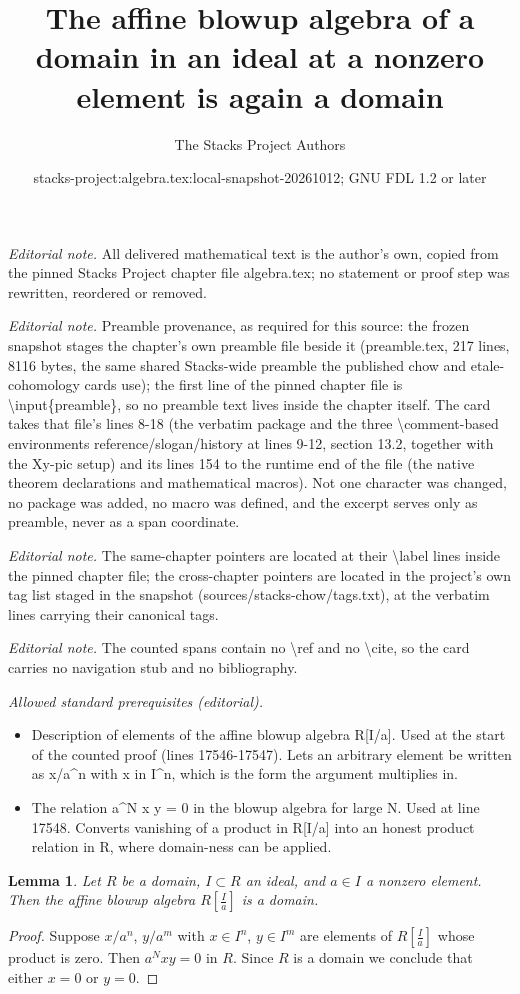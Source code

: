 \documentclass[10pt,a4paper]{amsart}
\title{The affine blowup algebra of a domain in an ideal at a nonzero element is again a domain}
\author{The Stacks Project Authors}
\date{stacks-project:algebra.tex:local-snapshot-20261012; GNU FDL 1.2 or later}
\theoremstyle{plain}
\newtheorem{lemma}[subsection]{Lemma}
\theoremstyle{definition}
\theoremstyle{remark}
\numberwithin{equation}{subsection}
\begin{document}
\maketitle
\noindent\textit{Editorial note.} All delivered mathematical text is the author's own, copied from the pinned Stacks Project chapter file algebra.tex; no statement or proof step was rewritten, reordered or removed.\par\medskip
\noindent\textit{Editorial note.} Preamble provenance, as required for this source: the frozen snapshot stages the chapter's own preamble file beside it (preamble.tex, 217 lines, 8116 bytes, the same shared Stacks-wide preamble the published chow and etale-cohomology cards use); the first line of the pinned chapter file is \textbackslash{}input\{preamble\}, so no preamble text lives inside the chapter itself. The card takes that file's lines 8-18 (the verbatim package and the three \textbackslash{}comment-based environments reference/slogan/history at lines 9-12, section 13.2, together with the Xy-pic setup) and its lines 154 to the runtime end of the file (the native theorem declarations and mathematical macros). Not one character was changed, no package was added, no macro was defined, and the excerpt serves only as preamble, never as a span coordinate.\par\medskip
\noindent\textit{Editorial note.} The same-chapter pointers are located at their \textbackslash{}label lines inside the pinned chapter file; the cross-chapter pointers are located in the project's own tag list staged in the snapshot (sources/stacks-chow/tags.txt), at the verbatim lines carrying their canonical tags.\par\medskip
\noindent\textit{Editorial note.} The counted spans contain no \textbackslash{}ref and no \textbackslash{}cite, so the card carries no navigation stub and no bibliography.\par\medskip
\noindent\textit{Allowed standard prerequisites (editorial).}\begin{itemize}
\item Description of elements of the affine blowup algebra R[I/a]. Used at the start of the counted proof (lines 17546-17547). Lets an arbitrary element be written as x/a\textasciicircum{}n with x in I\textasciicircum{}n, which is the form the argument multiplies in.
\item The relation a\textasciicircum{}N x y = 0 in the blowup algebra for large N. Used at line 17548. Converts vanishing of a product in R[I/a] into an honest product relation in R, where domain-ness can be applied.
\end{itemize}\medskip
\begin{lemma}
\label{lemma-blowup-domain}
Let $R$ be a domain, $I \subset R$ an ideal, and $a \in I$ a nonzero
element. Then the affine blowup algebra $R[\frac{I}{a}]$ is a domain.
\end{lemma}

\begin{proof}
Suppose $x/a^n$, $y/a^m$ with $x \in I^n$, $y \in I^m$
are elements of $R[\frac{I}{a}]$ whose product is zero.
Then $a^N x y = 0$ in $R$. Since $R$ is a domain we conclude
that either $x = 0$ or $y = 0$.
\end{proof}
\end{document}

